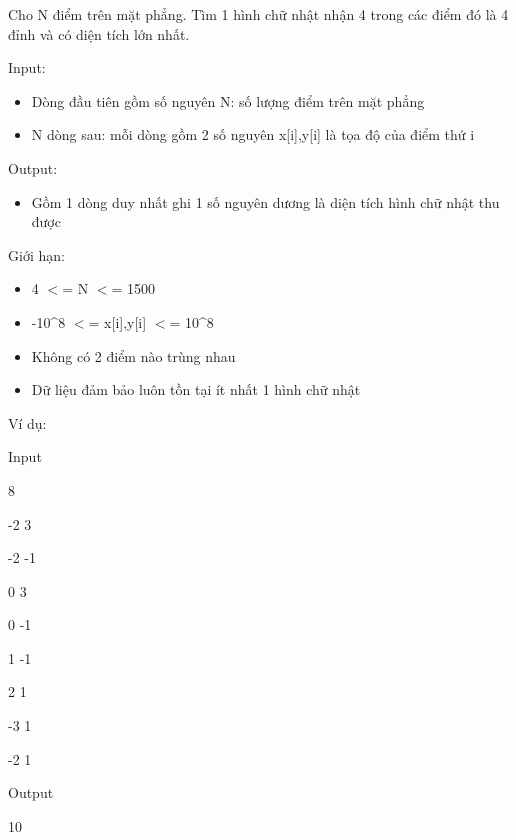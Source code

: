 



    Cho N điểm trên mặt phẳng. Tìm 1 hình chữ nhật nhận 4 trong các điểm đó là 4 đỉnh và có diện tích lớn nhất.   

    Input:   
\begin{itemize}
	\item 

      Dòng  đầu tiên gồm số nguyên N: số lượng điểm trên mặt  phẳng     
	\item 

      N  dòng sau: mỗi dòng gồm 2 số nguyên x[i],y[i] là tọa độ  của điểm thứ i     
\end{itemize}

    Output:   
\begin{itemize}
	\item 

      Gồm  1 dòng duy nhất ghi 1 số nguyên dương là diện tích hình  chữ nhật thu được     
\end{itemize}



    Giới hạn:   
\begin{itemize}
	\item 

      4  $<$= N $<$= 1500     
	\item 

      -10\textasciicircum8  $<$= x[i],y[i] $<$= 10\textasciicircum8     
	\item 

      Không  có 2 điểm nào trùng nhau     
	\item 

      Dữ  liệu đảm bảo luôn tồn tại ít nhất 1 hình chữ nhật     
\end{itemize}



    Ví dụ:   

        Input       

        8       

        -2 3       

        -2 -1       

        0 3       

        0 -1       

        1 -1       

        2 1       

        -3 1       

        -2 1       

        Output       

        10       